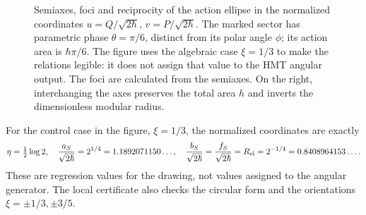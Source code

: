 \begin{figure}[htbp]
\endgroup


 \caption{Semiaxes, foci and reciprocity of the action ellipse in the normalized coordinates \(u=Q/\sqrt{2\hbar}\), \(v=P/\sqrt{2\hbar}\). The marked sector has parametric phase \(\theta=\pi/6\), distinct from its polar angle \(\phi\); its action area is \(\hbar\pi/6\). The figure uses the algebraic case \(\xi=1/3\) to make the relations legible: it does not assign that value to the HMT angular output. The foci are calculated from the semiaxes. On the right, interchanging the axes preserves the total area \(h\) and inverts the dimensionless modular radius.}
 \label{ii:fig:ii-elipse-calculada}
\end{figure}

For the control case in the figure, \(\xi=1/3\), the normalized coordinates are exactly
\[
 \eta=\tfrac12\log2,\quad
 \frac{a_S}{\sqrt{2\hbar}}=2^{1/4}=1.1892071150\ldots,\quad
 \frac{b_S}{\sqrt{2\hbar}}=
 \frac{f_S}{\sqrt{2\hbar}}=R_{\rm el}=2^{-1/4}=0.8408964153\ldots.
\]
These are regression values for the drawing, not values assigned to the angular generator. The local certificate also checks the circular form and the orientations \(\xi=\pm1/3,\pm3/5\).


